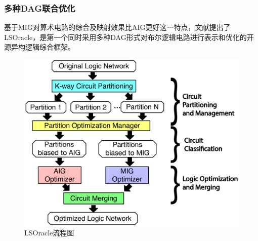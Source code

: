 \subsubsection{多种DAG联合优化}

基于MIG对算术电路的综合及映射效果比AIG更好这一特点，文献\cite{LS:LSOracle}提出了LSOracle，是第一个同时采用多种DAG形式对布尔逻辑电路进行表示和优化的开源异构逻辑综合框架。

\begin{figure}[!htbp]
    \centering
    \includegraphics[width=0.7\linewidth]{./figs/LS-LSOracle-flow.png}
    \caption{LSOracle流程图}
    \label{LS:LSOracle:Fig:flow}
\end{figure}

